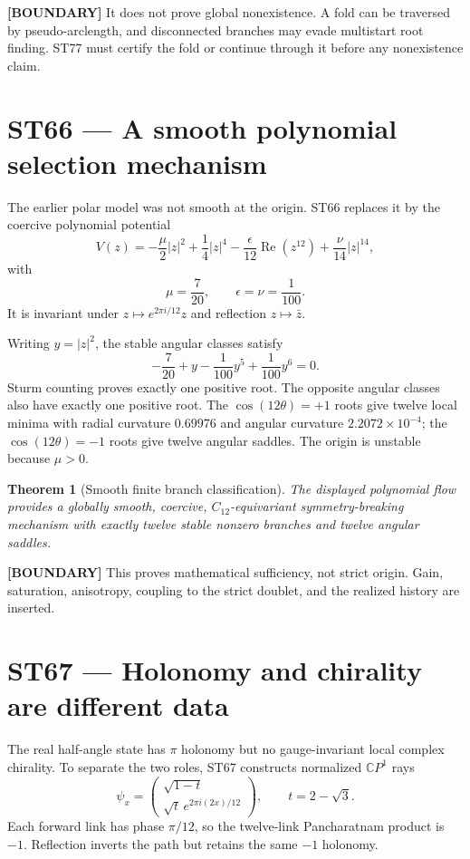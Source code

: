 \documentclass[11pt,a4paper]{article}
\newtheorem{theorem}{Theorem}[section]
\newcommand{\statusboundary}{\textcolor{orange!80!black}{\textbf{[BOUNDARY]}}}
\begin{document}
\statusboundary{} It does not prove global nonexistence. A fold can be traversed by pseudo-arclength, and disconnected branches may evade multistart root finding. ST77 must certify the fold or continue through it before any nonexistence claim.

\section{ST66 --- A smooth polynomial selection mechanism}

The earlier polar model was not smooth at the origin. ST66 replaces it by the coercive polynomial potential
\[
V(z)=-\frac\mu2|z|^2+\frac14|z|^4
-\frac\epsilon{12}\operatorname{Re}(z^{12})
+\frac\nu{14}|z|^{14},
\]
with
\[
\mu=\frac7{20},\qquad \epsilon=\nu=\frac1{100}.
\]
It is invariant under $z\mapsto e^{2\pi i/12}z$ and reflection $z\mapsto\bar z$.

Writing $y=|z|^2$, the stable angular classes satisfy
\[
-\frac7{20}+y-\frac1{100}y^5+\frac1{100}y^6=0.
\]
Sturm counting proves exactly one positive root. The opposite angular classes also have exactly one positive root. The $\cos(12\theta)=+1$ roots give twelve local minima with radial curvature $0.69976$ and angular curvature $2.2072\times10^{-4}$; the $\cos(12\theta)=-1$ roots give twelve angular saddles. The origin is unstable because $\mu>0$.

\begin{theorem}[Smooth finite branch classification]
The displayed polynomial flow provides a globally smooth, coercive, $C_{12}$-equivariant symmetry-breaking mechanism with exactly twelve stable nonzero branches and twelve angular saddles.
\end{theorem}

\statusboundary{} This proves mathematical sufficiency, not strict origin. Gain, saturation, anisotropy, coupling to the strict doublet, and the realized history are inserted.

\section{ST67 --- Holonomy and chirality are different data}

The real half-angle state has $\pi$ holonomy but no gauge-invariant local complex chirality. To separate the two roles, ST67 constructs normalized $\mathbb{C}P^1$ rays
\[
\psi_x=\begin{pmatrix}
\sqrt{1-t}\\ \sqrt t\,e^{2\pi i(2x)/12}
\end{pmatrix},\qquad t=2-\sqrt3.
\]
Each forward link has phase $\pi/12$, so the twelve-link Pancharatnam product is $-1$. Reflection inverts the path but retains the same $-1$ holonomy.
\end{document}
